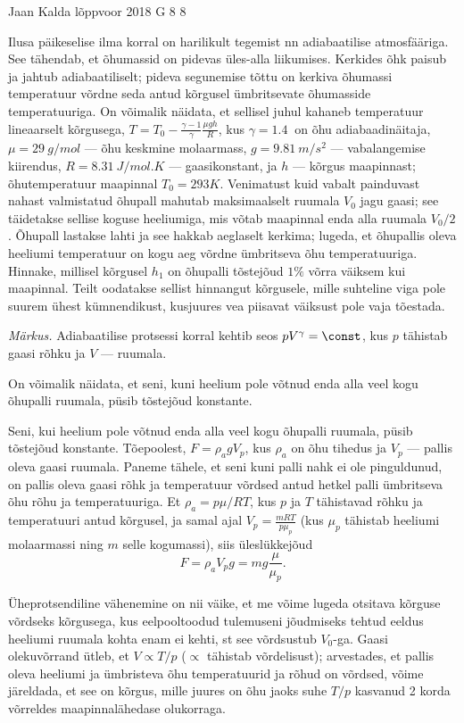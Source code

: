 {Jaan Kalda} %
{lõppvoor} %
{2018} %
{G 8} %
{8} %
{
\ifStatement
Ilusa päikeselise ilma korral on harilikult tegemist nn adiabaatilise atmosfääriga. See tähendab, et õhumassid on pidevas üles-alla liikumises. Kerkides õhk paisub ja jahtub adiabaatiliselt; pideva segunemise tõttu on kerkiva õhumassi temperatuur võrdne seda antud kõrgusel ümbritsevate õhumasside temperatuuriga. On võimalik näidata, et sellisel juhul kahaneb temperatuur lineaarselt kõrgusega, $T=T_0-\frac{\gamma-1}\gamma\frac{\mu g h}R$, kus $\gamma=\SI{1.4}{	}$ on õhu adiabaadinäitaja, $\mu=\SI{29}{g/mol}$ --- õhu keskmine molaarmass, $g=\SI{9.81}{m/s^2}$ --- vabalangemise kiirendus, $R=\SI{8.31}{J/mol.K}$ --- gaasikonstant, ja $h$ --- kõrgus maapinnast; õhutemperatuur maapinnal $T_0=\SI{293}K$. Venimatust kuid vabalt painduvast nahast valmistatud õhupall mahutab maksimaalselt ruumala $V_0$ jagu gaasi; see täidetakse sellise koguse heeliumiga, mis võtab maapinnal enda alla ruumala $V_0/2$. Õhupall lastakse lahti ja see hakkab aeglaselt kerkima; lugeda, et õhupallis oleva heeliumi temperatuur on kogu aeg võrdne ümbritseva õhu temperatuuriga. Hinnake, millisel kõrgusel $h_1$ on õhupalli tõstejõud $1\%$ võrra väiksem kui maapinnal. Teilt oodatakse sellist hinnangut kõrgusele, mille suhteline viga pole suurem ühest kümnendikust, kusjuures vea piisavat väiksust pole vaja tõestada. 

\emph{Märkus.} Adiabaatilise protsessi korral kehtib seos $pV^\gamma = \const$, kus $p$ tähistab gaasi rõhku ja $V$ --- ruumala.
\fi


\ifHint
On võimalik näidata, et seni, kuni heelium pole võtnud enda alla veel kogu õhupalli ruumala, püsib tõstejõud konstante.
\fi


\ifSolution
Seni, kui heelium pole võtnud enda alla veel kogu õhupalli ruumala, püsib tõstejõud konstante. Tõepoolest, $F=\rho_a g V_p$, kus $\rho_a$ on õhu tihedus ja $V_p$ --- pallis oleva gaasi ruumala. Paneme tähele, et seni kuni palli nahk ei ole pinguldunud, on pallis oleva gaasi rõhk ja temperatuur võrdsed antud hetkel palli ümbritseva õhu rõhu ja temperatuuriga. Et $\rho_a=p\mu/RT$, kus $p$ ja $T$ tähistavad rõhku ja temperatuuri antud kõrgusel, ja samal ajal $V_p=\frac {mRT}{p\mu_p}$ (kus $\mu_p$ tähistab heeliumi molaarmassi ning $m$ selle kogumassi), siis üleslükkejõud
\[
F=\rho_a V_p g=mg\frac{\mu}{\mu_p}.
\]

Üheprotsendiline vähenemine on nii väike, et me võime lugeda otsitava kõrguse võrdseks kõrgusega, kus eelpooltoodud tulemuseni jõudmiseks tehtud eeldus heeliumi ruumala kohta enam ei kehti, st see võrdsustub $V_0$-ga. Gaasi olekuvõrrand ütleb, et $V\propto T/p$ ($\propto$ tähistab võrdelisust); arvestades, et pallis oleva heeliumi ja ümbristeva õhu temperatuurid ja rõhud on võrdsed, võime järeldada, et see on kõrgus, mille juures on õhu jaoks suhe $T/p$ kasvanud 2 korda võrreldes maapinnalähedase olukorraga. 

}

